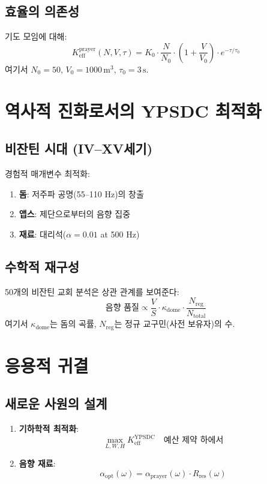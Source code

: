 \documentclass[12pt,a4paper]{article}
\begin{document}
	\subsection{효율의 의존성}
	
	기도 모임에 대해:
	\[
	K_{\mathrm{eff}}^{\mathrm{prayer}}(N, V, \tau) = K_0 \cdot \frac{N}{N_0} \cdot \left(1 + \frac{V}{V_0}\right) \cdot e^{-\tau/\tau_0}
	\]
	여기서 $N_0 = 50$, $V_0 = 1000 \, \mathrm{m}^3$, $\tau_0 = 3 \, \mathrm{s}$.
	
	\section{역사적 진화로서의 YPSDC 최적화}
	
	\subsection{비잔틴 시대 (IV–XV세기)}
	
	경험적 매개변수 최적화:
	\begin{enumerate}
		\item \textbf{돔}: 저주파 공명(55–110 Hz)의 창출
		\item \textbf{앱스}: 제단으로부터의 음향 집중
		\item \textbf{재료}: 대리석($\alpha = 0.01$ at 500 Hz)
	\end{enumerate}
	
	\subsection{수학적 재구성}
	
	50개의 비잔틴 교회 분석은 상관 관계를 보여준다:
	\[
	\text{음향 품질} \propto \frac{V}{S} \cdot \kappa_{\mathrm{dome}} \cdot \frac{N_{\mathrm{reg}}}{N_{\mathrm{total}}}
	\]
	여기서 $\kappa_{\mathrm{dome}}$는 돔의 곡률, $N_{\mathrm{reg}}$는 정규 교구민(사전 보유자)의 수.
	
	\section{응용적 귀결}
	
	\subsection{새로운 사원의 설계}
	
	\begin{enumerate}
		\item \textbf{기하학적 최적화}:
		\[
		\max_{L, W, H} K_{\mathrm{eff}}^{\mathrm{YPSDC}} \quad \text{예산 제약 하에서}
		\]
		\item \textbf{음향 재료}:
		\[
		\alpha_{\mathrm{opt}}(\omega) = \alpha_{\mathrm{prayer}}(\omega) \cdot R_{\mathrm{res}}(\omega)
		\]
	\end{enumerate}
	
\end{document}
